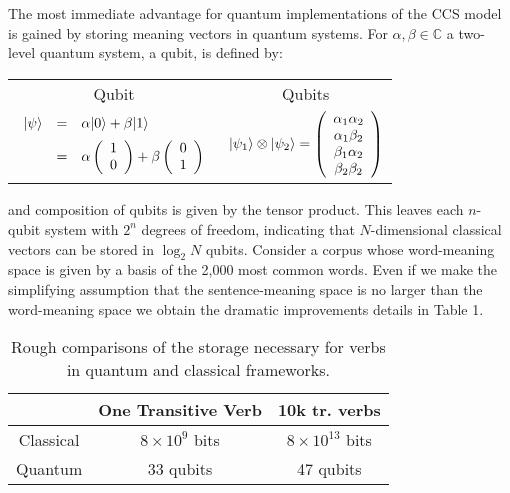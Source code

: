 The most immediate advantage for quantum implementations of the CCS model is gained by storing meaning vectors in quantum systems.  For $\alpha,\beta\in \mathbb{C}$ a two-level quantum system, a qubit, is defined by:
\begin{center}
  \begin{tabular}{cc}
   Qubit & Qubits  \\
   $\begin{array}{lcl}
        | \psi \rangle &=& \alpha| 0 \rangle+\beta| 1 \rangle \\[0.2cm]
        &=&\alpha\left(\begin{array}{c} 1 \\ 0 \end{array}\right)
            +\beta\left(\begin{array}{c} 0 \\ 1 \end{array}\right)
   \end{array} $
   &\qquad\qquad
   $| \psi_1 \rangle\otimes| \psi_2 \rangle = \left(\begin{array}{c} \alpha_1\alpha_2 \\ \alpha_1\beta_2\\\beta_1\alpha_2\\\beta_2\beta_2 \end{array}\right)$
   \\
  \end{tabular}
\end{center}
and composition of qubits is given by the tensor product.  This leaves each $n$-qubit system with $2^n$ degrees of freedom, indicating that $N$-dimensional classical vectors can be stored in $\log_2 N$ qubits.
Consider a corpus whose word-meaning space is given by a basis of the 2,000 most common words. Even if we make the simplifying assumption that the sentence-meaning space is no larger than the word-meaning space we obtain the dramatic improvements details in Table 1.

\begin{table}[t]
\label{tab:space}
\begin{center}
\begin{tabular}{|c|c|c|}\hline
 & One Transitive Verb & 10k tr. verbs \\\hline
 Classical & $8\times 10^{9}$ bits & $8\times 10^{13}$ bits \\\hline
 Quantum & 33 qubits & 47 qubits \\\hline
\end{tabular}
\end{center}
\caption{Rough comparisons of the storage necessary for verbs in quantum and classical frameworks.}
\end{table}

